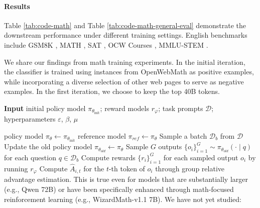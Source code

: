 \paragraph{Results}
Table \ref{tab:code-math} and Table \ref{tab:code-math-general-eval} demonstrate the downstream performance under different training settings. English benchmarks include GSM8K \citep{gsm8k}, MATH \citep{MATH}, SAT \citep{llemma}, OCW Courses \citep{minerva}, MMLU-STEM \citep{mmlu}. \item We share our findings from math training experiments. In the initial iteration, the classifier is trained using instances from OpenWebMath \citep{openwebmath} as positive examples, while incorporating a diverse selection of other web pages to serve as negative examples. In the first iteration, we choose to keep the top 40B tokens. \begin{algorithm}[t]
  \small
  \caption{Iterative Group Relative Policy Optimization}
  \textbf{Input} initial policy model $\pi_{\theta_{\text{init}}}$; reward models $r_\varphi$; task prompts $\mathcal{D}$; 
  hyperparameters $\varepsilon$, $\beta$, $\mu$
  \begin{algorithmic}[1]
    \State policy model $\pi_\theta \leftarrow \pi_{\theta_{\text{init}}}$
       \State reference model $\pi_{ref} \leftarrow \pi_{\theta}$
      \State Sample a batch $\mathcal{D}_b$ from $\mathcal{D}$
      \State Update the old policy model $\pi_{\theta_{old}} \leftarrow \pi_{\theta}$ 
      \State Sample $G$ outputs $\{o_i\}_{i=1}^G \sim \pi_{\theta_{old}} (\cdot \mid q) $ for each question $q \in \mathcal{D}_b$
      \State Compute rewards $\{r_i\}_{i=1}^{G}$ for each sampled output $o_i$ by running $r_{\varphi}$ 
      \State Compute $\hat{A}_{i,t}$ for the $t$-th token of $o_i$ through group relative advantage estimation. This is true even for models that are substantially larger (e.g., Qwen 72B) or have been specifically enhanced through math-focused reinforcement learning (e.g., WizardMath-v1.1 7B). We have not yet studied:


\end{algorithmic}
\end{algorithm}
